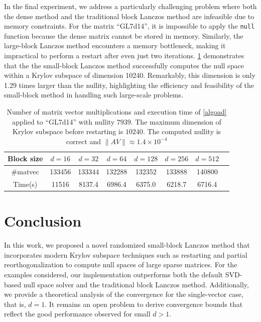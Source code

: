 \documentclass{siamart190516}
\providecommand{\norm}[1]{\lVert#1\rVert}
\begin{document}
In the final experiment, we address a particularly challenging problem where both the dense method and the traditional block Lanczos method are infeasible due to memory constraints. For the matrix ``GL7d14'', it is impossible to apply the \texttt{null} function because the dense matrix cannot be stored in memory. Similarly, the large-block Lanczos method encounters a memory bottleneck, making it impractical to perform a restart after even just two iterations. \cref{tabCHLS} demonstrates that the the small-block Lanczos method successfully computes the null space within a Krylov subspace of dimension 10240. Remarkably, this dimension is only 1.29 times larger than the nullity, highlighting the efficiency and feasibility of the small-block method in handling such large-scale problems.

\begin{table}[htbp]
    \centering
    \caption{Number of matrix vector multiplications and execution time of \cref{algoad} applied to ``GL7d14'' with nullity $7939$. The maximum dimension of Krylov subspace before restarting is $10240$. The computed nullity is correct and $\norm{AV}\approx1.4\times10^{-4}$}
    \label{tabCHLS}
    \begin{tabular}{|c|c|c|c|c|c|c|c|}
        \hline
        Block size & $d=16$ & $d=32$ & $d=64$ & $d=128$ & $d=256$ & $d=512$   \\ \hline 
        $\#$matvec & 133456 & 133344 & 132288 & 132352 & 133888 & 140800   \\ \hline
        Time(s) &11516 & 8137.4 & 6986.4 & 6375.0 & 6218.7 & 6716.4 \\ \hline
    \end{tabular}    
\end{table}


\section{Conclusion}
In this work, we proposed a novel randomized small-block Lanczos method that incorporates modern Krylov subspace techniques such as restarting and partial reorthogonalization to compute null spaces of large sparse matrices. For the examples considered, our implementation outperforms both the default SVD-based null space solver and the traditional block Lanczos method. Additionally, we provide a theoretical analysis of the convergence for the single-vector case, that is, $d = 1$. It remains an open problem to derive convergence bounds that reflect the good performance observed for small $d>1$.
\end{document}
